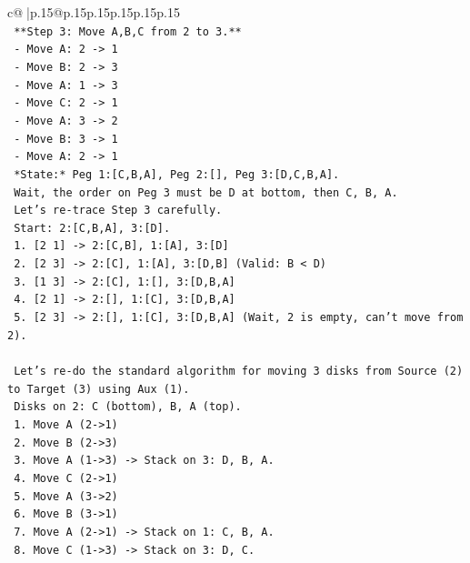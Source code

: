 \documentclass{article}
\begin{document}
{\begin{supertabular}{c@{$\;$}|p{.15\linewidth}@{}p{.15\linewidth}p{.15\linewidth}p{.15\linewidth}p{.15\linewidth}p{.15\linewidth}}
{{{\\ 
\texttt{  **Step 3: Move A,B,C from 2 to 3.**} \\
\texttt{  {-} Move A: 2 {-}> 1} \\
\texttt{  {-} Move B: 2 {-}> 3} \\
\texttt{  {-} Move A: 1 {-}> 3} \\
\texttt{  {-} Move C: 2 {-}> 1} \\
\texttt{  {-} Move A: 3 {-}> 2} \\
\texttt{  {-} Move B: 3 {-}> 1} \\
\texttt{  {-} Move A: 2 {-}> 1} \\
\texttt{  *State:* Peg 1:{[}C,B,A{]}, Peg 2:{[}{]}, Peg 3:{[}D,C,B,A{]}.} \\
\texttt{  Wait, the order on Peg 3 must be D at bottom, then C, B, A.} \\
\texttt{  Let's re{-}trace Step 3 carefully.} \\
\texttt{  Start: 2:{[}C,B,A{]}, 3:{[}D{]}.} \\
\texttt{  1. {[}2 1{]} {-}> 2:{[}C,B{]}, 1:{[}A{]}, 3:{[}D{]}} \\
\texttt{  2. {[}2 3{]} {-}> 2:{[}C{]}, 1:{[}A{]}, 3:{[}D,B{]} (Valid: B < D)} \\
\texttt{  3. {[}1 3{]} {-}> 2:{[}C{]}, 1:{[}{]}, 3:{[}D,B,A{]}} \\
\texttt{  4. {[}2 1{]} {-}> 2:{[}{]}, 1:{[}C{]}, 3:{[}D,B,A{]}} \\
\texttt{  5. {[}2 3{]} {-}> 2:{[}{]}, 1:{[}C{]}, 3:{[}D,B,A{]} (Wait, 2 is empty, can't move from 2).} \\
\\ 
\texttt{  Let's re{-}do the standard algorithm for moving 3 disks from Source (2) to Target (3) using Aux (1).} \\
\texttt{  Disks on 2: C (bottom), B, A (top).} \\
\texttt{  1. Move A (2{-}>1)} \\
\texttt{  2. Move B (2{-}>3)} \\
\texttt{  3. Move A (1{-}>3) {-}> Stack on 3: D, B, A.} \\
\texttt{  4. Move C (2{-}>1)} \\
\texttt{  5. Move A (3{-}>2)} \\
\texttt{  6. Move B (3{-}>1)} \\
\texttt{  7. Move A (2{-}>1) {-}> Stack on 1: C, B, A.} \\
\texttt{  8. Move C (1{-}>3) {-}> Stack on 3: D, C.} \\
}}}
\end{supertabular}}
\end{document}
